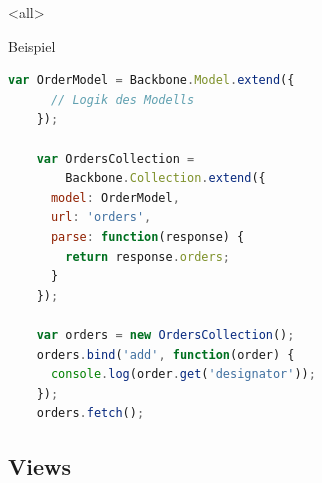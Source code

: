 \mode
<all>


\begin{frame}[fragile]{Beispiel}
  \begin{lstlisting}[language=JavaScript,gobble=4]
    var OrderModel = Backbone.Model.extend({
      // Logik des Modells
    });
    
    var OrdersCollection =
        Backbone.Collection.extend({
      model: OrderModel,
      url: 'orders',
      parse: function(response) {
        return response.orders;
      }
    });
    
    var orders = new OrdersCollection();
    orders.bind('add', function(order) {
      console.log(order.get('designator'));
    });
    orders.fetch();
  \end{lstlisting}
\end{frame}

\subsection{Views}

